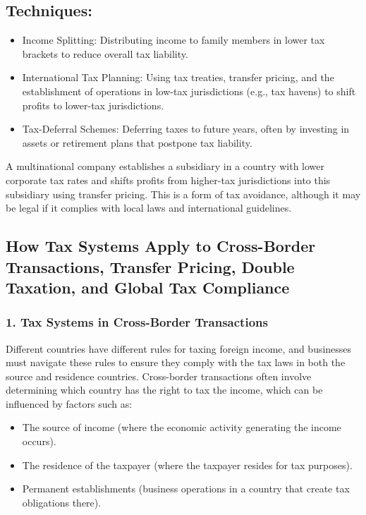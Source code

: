 \documentclass[10pt]{article}
\begin{document}
\subsection*{Techniques:}
\begin{itemize}
  \item Income Splitting: Distributing income to family members in lower tax brackets to reduce overall tax liability.
  \item International Tax Planning: Using tax treaties, transfer pricing, and the establishment of operations in low-tax jurisdictions (e.g., tax havens) to shift profits to lower-tax jurisdictions.
  \item Tax-Deferral Schemes: Deferring taxes to future years, often by investing in assets or retirement plans that postpone tax liability.
\end{itemize}

\begin{example}
	A multinational company establishes a subsidiary in a country with lower corporate tax rates and shifts profits from higher-tax jurisdictions into this subsidiary using transfer pricing. This is a form of tax avoidance, although it may be legal if it complies with local laws and international guidelines.
\end{example}


\subsection*{How Tax Systems Apply to Cross-Border Transactions, Transfer Pricing, Double Taxation, and Global Tax Compliance}
\subsubsection*{1. Tax Systems in Cross-Border Transactions}
Different countries have different rules for taxing foreign income, and businesses must navigate these rules to ensure they comply with the tax laws in both the source and residence countries. Cross-border transactions often involve determining which country has the right to tax the income, which can be influenced by factors such as:

\begin{itemize}
  \item The source of income (where the economic activity generating the income occurs).
  \item The residence of the taxpayer (where the taxpayer resides for tax purposes).
  \item Permanent establishments (business operations in a country that create tax obligations there).
\end{itemize}
\end{document}
